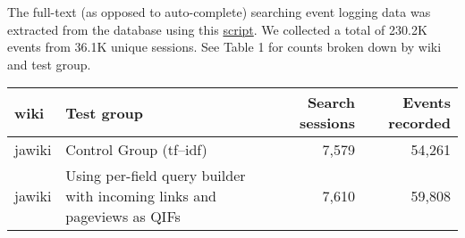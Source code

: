 \documentclass[12pt,]{article}
\begin{document}
The full-text (as opposed to auto-complete) searching event logging data
was extracted from the database using this
\href{https://github.com/wikimedia-research/Discovery-Search-2ndTest-BM25_jazhth/blob/master/data.R}{script}.
We collected a total of 230.2K events from 36.1K unique sessions. See
Table 1 for counts broken down by wiki and test group.

\begin{longtable}[]{@{}llrr@{}}
\toprule
\begin{minipage}[b]{0.08\columnwidth}\raggedright\strut
wiki\strut
\end{minipage} & \begin{minipage}[b]{0.55\columnwidth}\raggedright\strut
Test group\strut
\end{minipage} & \begin{minipage}[b]{0.13\columnwidth}\raggedleft\strut
Search sessions\strut
\end{minipage} & \begin{minipage}[b]{0.13\columnwidth}\raggedleft\strut
Events recorded\strut
\end{minipage}\tabularnewline
\midrule
\endhead
\begin{minipage}[t]{0.08\columnwidth}\raggedright\strut
jawiki\strut
\end{minipage} & \begin{minipage}[t]{0.55\columnwidth}\raggedright\strut
Control Group (tf--idf)\strut
\end{minipage} & \begin{minipage}[t]{0.13\columnwidth}\raggedleft\strut
7,579\strut
\end{minipage} & \begin{minipage}[t]{0.13\columnwidth}\raggedleft\strut
54,261\strut
\end{minipage}\tabularnewline
\begin{minipage}[t]{0.08\columnwidth}\raggedright\strut
jawiki\strut
\end{minipage} & \begin{minipage}[t]{0.55\columnwidth}\raggedright\strut
Using per-field query builder with incoming links and pageviews as
QIFs\strut
\end{minipage} & \begin{minipage}[t]{0.13\columnwidth}\raggedleft\strut
7,610\strut
\end{minipage} & \begin{minipage}[t]{0.13\columnwidth}\raggedleft\strut
59,808\strut
\end{minipage}\tabularnewline

\end{longtable}
\end{document}
